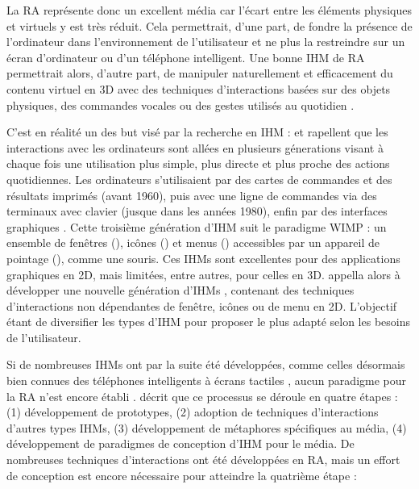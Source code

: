 La RA représente donc un excellent média car l'écart entre les éléments physiques et virtuels y est très réduit. Cela permettrait, d'une part, de fondre la présence de l'ordinateur dans l'environnement de l'utilisateur et ne plus la restreindre sur un écran d'ordinateur ou d'un téléphone intelligent. Une bonne IHM de RA permettrait alors, d'autre part, de manipuler naturellement et efficacement du contenu virtuel en 3D avec des techniques d'interactions basées sur des objets physiques, des commandes vocales ou des gestes utilisés au quotidien \citep{Billinghurst2005}.

C'est en réalité un des but visé par la recherche en IHM : \cite{VanDam1997} et \cite{Jacob2008} rapellent que les interactions avec les ordinateurs sont allées en plusieurs génerations visant à chaque fois une utilisation plus simple, plus directe et plus proche des actions quotidiennes. Les ordinateurs s'utilisaient par des cartes de commandes et des résultats imprimés (avant 1960), puis avec une ligne de commandes via des terminaux avec clavier (jusque dans les années 1980), enfin par des interfaces graphiques . Cette troisième génération d'IHM suit le paradigme WIMP : un ensemble de fenêtres (), icônes () et menus () accessibles par un appareil de pointage (), comme une souris. Ces IHMs sont excellentes pour des applications graphiques en 2D, mais limitées, entre autres, pour celles en 3D. \cite{VanDam1997} appella alors à développer une nouvelle génération d'IHMs , contenant des techniques d'interactions non dépendantes de fenêtre, icônes ou de menu en 2D. L'objectif étant de diversifier les types d'IHM pour proposer le plus adapté selon les besoins de l'utilisateur.


Si de nombreuses IHMs  ont par la suite été développées, comme celles désormais bien connues des téléphones intelligents à écrans tactiles \cite{Jacob2008}, aucun paradigme pour la RA n'est encore établi \citep{VanKrevelen2010}. \cite{Billinghurst2005} décrit que ce processus se déroule en quatre étapes : (1) développement de prototypes, (2) adoption de techniques d'interactions d'autres types IHMs, (3) développement de métaphores spécifiques au média, (4) développement de paradigmes de conception d'IHM pour le média. De nombreuses techniques d'interactions ont été développées en RA, mais un effort de conception est encore nécessaire pour atteindre la quatrième étape : \cite{Billinghurst2015}

